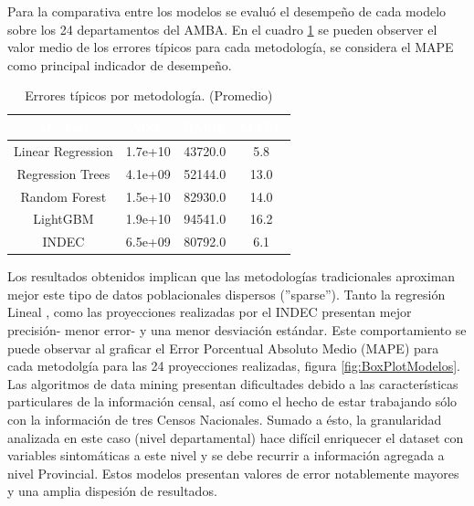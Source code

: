 \documentclass{article}
\theoremstyle{mytheoremstyle}
\theoremstyle{mytheoremstyle}
\theoremstyle{myproblemstyle}
\begin{document}
 
 Para la comparativa entre los modelos se evaluó el desempeño de cada modelo sobre los 24 departamentos del AMBA.
 En el cuadro \ref{tab:AvgErrors} se pueden observer el valor medio de los errores típicos para cada metodología,
  se considera el MAPE como principal indicador de desempeño. \newline 
 \begin{table}[htb!]
  \centering
  \begin{tabular}{|c|c|c|c|}
  \hline
  \textbf{\cellcolor[rgb]{0,0.231,0.427}\textcolor{white}{Method}} & \textbf{\cellcolor[rgb]{0,0.231,0.427}\textcolor{white}{MSE}} & \textbf{\cellcolor[rgb]{0,0.231,0.427}\textcolor{white}{RMSE}} & \textbf{\cellcolor[rgb]{0,0.231,0.427}\textcolor{white}{MAPE}} \\ \hline
  Linear Regression & 1.7e+10 & 43720.0 & 5.8 \\
  Regression Trees & 4.1e+09 & 52144.0 & 13.0 \\
  Random Forest & 1.5e+10 & 82930.0 & 14.0 \\
  LightGBM & 1.9e+10 & 94541.0 & 16.2 \\
  INDEC & 6.5e+09 & 80792.0 & 6.1 \\
  \hline
  \end{tabular}
  \caption{ Errores típicos por metodología. (Promedio)}
  \label{tab:AvgErrors}
\end{table}
  
 Los resultados obtenidos implican  que  las metodologías tradicionales aproximan mejor este tipo de datos poblacionales dispersos (''sparse''). Tanto la regresión Lineal ,
 como las proyecciones realizadas por el INDEC presentan mejor precisión- menor error- y una menor desviación estándar.
  Este comportamiento se puede
 observar  al  graficar el  Error Porcentual Absoluto Medio (MAPE) para cada metodolgía para las 24 proyecciones realizadas, figura \ref{fig:BoxPlotModelos}.\newline
  Las algoritmos de data mining presentan dificultades debido a las características particulares de la información censal, así como  el hecho de estar trabajando sólo con la información de 
 tres Censos Nacionales. Sumado a ésto, la granularidad analizada en este caso (nivel departamental) hace difícil enriquecer el dataset con variables sintomáticas a este nivel 
 y se debe recurrir a información agregada a nivel Provincial. Estos modelos presentan valores de error notablemente mayores y una amplia dispesión de resultados.\newline
\end{document}
